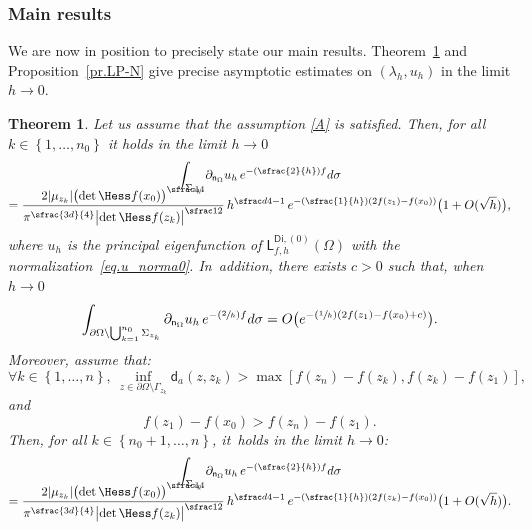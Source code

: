 \documentclass[10pt]{amsart}
\newcommand{\Psfrac}[2]{(\sfrac{#1}{#2})}
\theoremstyle{plain}
\newtheorem{theorem}{Theorem}
\theoremstyle{definition}
\let\oldbigcup\bigcup
\begin{document}
\subsubsection{Main results}
\label{ssec.mainresu}
We are now in position to precisely state our main results. Theorem~\ref{thm1} and Proposition~\ref{pr.LP-N} give precise
asymptotic estimates on $(\lambda_h,u_h)$ in the limit $h \to 0$.
\begin{theorem}\label{thm1}
Let us assume that the assumption \ref{A} is satisfied. Then, for all $k\in \left\{1,\ldots,n_0\right\}$ it holds in the limit $h\to 0$\vspace*{-5pt}
\begin{multline}\label{eq.dnuh_asymptot}
\int_{\Sigma_{z_k}}\partial_{\mathsf n_\Omega} u_h \, e^{-\Psfrac{2}{h} f} d\sigma\\[-10pt]
= \frac{ 2\vert \mu_{z_k}\vert \bigl(\det \Hess f (x_0) \bigr)^{\sfrac14} }{ \pi^{\sfrac{3d}{4}}\bigl\vert \det \Hess f (z_k) \bigr\vert^{\sfrac12}} \, h^{\sfrac d4 -1} \,e^{-\Psfrac{1}{h}(2f(z_1)-f(x_0))}\bigl(1+ O({\sqrt h}) \bigr),
\end{multline}
where $u_h$ is the principal eigenfunction of $\mathsf L^{\mathsf{Di},(0)}_{f,h}(\Omega)$ with the normalization~\eqref{eq.u_norma0}. In~addition, there exists $c>0$ such that, when $h\to 0$\vspace*{-3pt}
\begin{equation}\label{eq.dnuh_asymptot2}
\int_{\partial \Omega \setminus \oldbigcup_{k=1}^{n_0}\Sigma_{z_k}} \partial_{\mathsf n_\Omega} u_h \, e^{-\Psfrac{2}{h} f} d\sigma= O\bigl(e^{-\Psfrac{1}{h}(2f(z_1)-f(x_0)+c)} \bigr).
\end{equation}
Moreover, assume that:\vspace*{-3pt}
\begin{equation}
\label{hypo1}
\forall k\in \left\{1,\ldots,n\right\}, \ \inf_{z\in \partial \Omega\setminus \Gamma_{z_k}} \mathsf d_a(z,z_k) >\max[f(z_n)-f(z_k),f(z_k)-f(z_1)],
\end{equation}
and\vspace*{-3pt}
\begin{equation}
\label{hypo2}
f(z_1)-f(x_0)>f(z_n)-f(z_1).
\end{equation}
Then, for all $k\in \left\{n_0+1,\ldots,n\right\}$, it~holds in the limit $h\to 0$:\vspace*{-5pt}
\begin{multline}\label{eq.dnuh_asymptot3}
\int_{\Sigma_{z_k}}\partial_{\mathsf n_\Omega} u_h \,
e^{-\Psfrac{2}{h} f} d\sigma\\[-10pt]
=\frac{ 2\vert \mu_{z_k}\vert \bigl(\det \Hess f (x_0) \bigr)^{\sfrac14} }{ \pi^{\sfrac{3d}{4}}\bigl\vert \det \Hess f (z_k) \bigr\vert^{\sfrac12}} \, h^{\sfrac d4 -1} \,e^{-\Psfrac{1}{h}(2f(z_k)-f(x_0))}\bigl(1+ O({\sqrt h}) \bigr).
\end{multline}
\end{theorem}
\end{document}
